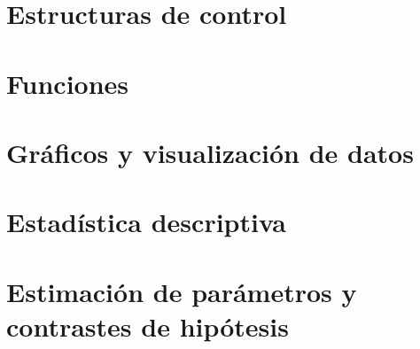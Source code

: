 \documentclass[
]{book}
\begin{document}
\hypertarget{estructuras-de-control}{%
\chapter{Estructuras de control}\label{estructuras-de-control}}

\hypertarget{funciones}{%
\chapter{Funciones}\label{funciones}}

\hypertarget{gruxe1ficos-y-visualizaciuxf3n-de-datos}{%
\chapter{Gráficos y visualización de datos}\label{gruxe1ficos-y-visualizaciuxf3n-de-datos}}

\hypertarget{estaduxedstica-descriptiva}{%
\chapter{Estadística descriptiva}\label{estaduxedstica-descriptiva}}

\hypertarget{estimaciuxf3n-de-paruxe1metros-y-contrastes-de-hipuxf3tesis}{%
\chapter{Estimación de parámetros y contrastes de hipótesis}\label{estimaciuxf3n-de-paruxe1metros-y-contrastes-de-hipuxf3tesis}}

  
\end{document}
